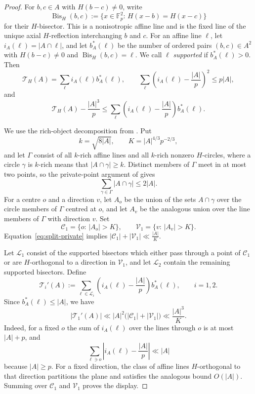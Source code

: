 \documentclass[11pt]{article}
\newcommand{\F}{\mathbb F}
\begin{document}
\begin{proof}
For $b,c\in A$ with $H(b-c)\ne0$, write
\[
\operatorname{Bis}_H(b,c)  :=\{x\in\F_p^2:\, H(x-b)=H(x-c)\}
\]
for their $H$-bisector.  This is a nonisotropic affine line and is the fixed line of the unique axial $H$-reflection interchanging
$b$ and $c$. For an affine line $\ell$, let $i_A(\ell)=|A\cap\ell|$, and let $b_A^*(\ell)$ be the number of ordered pairs $(b,c)\in A^2$ with $H(b-c)\ne0$ and $\operatorname{Bis}_H(b,c)=\ell$. We call $\ell$ \emph{supported} if $b_A^*(\ell)>0$. Then
\[
\mathcal T_H(A)=\sum_\ell i_A(\ell)b_A^*(\ell), \qquad \sum_\ell\left(i_A(\ell)-\frac{|A|}{p}\right)^2\le p|A|,
\]
and
\begin{equation}\label{eq:split-balanced-initial}
\mathcal T_H(A)-\frac{|A|^3}{p} \le \sum_\ell\left(i_A(\ell)-\frac{|A|}{p}\right)b_A^*(\ell).
\end{equation}

We use the rich-object decomposition from \cite[Sections~5.1--5.5]{MPPRS}.  Put
\[
k=\sqrt{8|A|}, \qquad  K=|A|^{4/3}p^{-2/3},
\]
and let $\Gamma$ consist of all $k$-rich affine lines and all $k$-rich nonzero $H$-circles, where a circle $\gamma$ is $k$-rich means that $|A\cap\gamma|\ge k$. Distinct members of $\Gamma$ meet in at most two points, so the private-point argument of \cite[Lemma~16]{MPPRS} gives
\begin{equation}  \label{eq:split-private}
\sum_{\gamma\in\Gamma}|A\cap\gamma|\le2|A|.
\end{equation}
For a centre $o$ and a direction $v$, let $A_o$ be the union of the sets $A\cap\gamma$ over the circle members of $\Gamma$ centred at $o$, and let $A_v$ be the analogous union over the line members of $\Gamma$ with direction $v$.  Set
\[
\mathcal C_1=\{o:\, |A_o|>K\}, \qquad \mathcal V_1=\{v:\, |A_v|>K\}.
\]
Equation~\eqref{eq:split-private} implies $|\mathcal C_1|+|\mathcal V_1|\ll\frac{|A|}{K}$. 

Let $\mathcal L_1$ consist of the supported bisectors which either pass through a point of $\mathcal C_1$ or are $H$-orthogonal to a
direction in $\mathcal V_1$, and let $\mathcal L_2$ contain the remaining supported bisectors.  Define
\[
\mathcal T_i'(A) := \sum_{\ell\in\mathcal L_i} \left(i_A(\ell)-\frac{|A|}{p}\right)b_A^*(\ell),
 \qquad i=1,2.
\]
Since $b_A^*(\ell)\le |A|$, we have
\begin{equation}\label{eq:split-rich-part}
|\mathcal T_1'(A)| \ll |A|^2\bigl(|\mathcal C_1|+|\mathcal V_1|\bigr) \ll\frac{|A|^3}{K}.
\end{equation}
Indeed, for a fixed $o$ the sum of $i_A(\ell)$ over the lines through $o$ is at most $|A|+p$, and
\[
\sum_{\ell\ni o} \left|i_A(\ell)-\frac{|A|}{p}\right|\ll |A|
\]
because $|A|\ge p$.  For a fixed direction, the class of affine lines $H$-orthogonal to that direction partitions the plane and satisfies the analogous bound $O(|A|)$.  Summing over $\mathcal C_1$ and $\mathcal V_1$ proves the display.


\end{proof}
\end{document}
